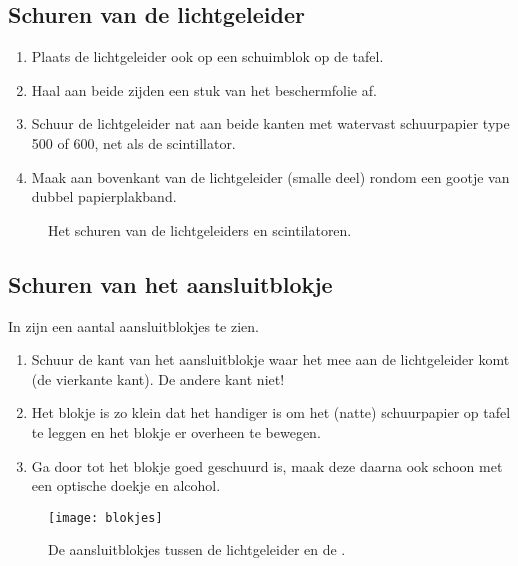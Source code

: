 \subsection{Schuren van de lichtgeleider}

\begin{enumerate}
    \item Plaats de lichtgeleider ook op een schuimblok op de tafel.
    \item Haal aan beide zijden een stuk van het beschermfolie af.
    \item Schuur de lichtgeleider nat aan beide kanten met watervast
    schuurpapier type 500 of 600, net als de scintillator.
    \item Maak aan bovenkant van de lichtgeleider (smalle deel) rondom
    een gootje van dubbel papierplakband.
\end{enumerate}

\begin{figure}
    \centering
    \caption{Het schuren van de lichtgeleiders en scintilatoren.}
\end{figure}


\subsection{Schuren van het aansluitblokje}

In  zijn een aantal aansluitblokjes te zien.

\begin{enumerate}
    \item Schuur de kant van het aansluitblokje waar het mee aan de
    lichtgeleider komt (de vierkante kant). De andere kant niet!
    \item Het blokje is zo klein dat het handiger is om het (natte)
    schuurpapier op tafel te leggen en het blokje er overheen te bewegen.
    \item Ga door tot het blokje goed geschuurd is, maak deze daarna ook
    schoon met een optische doekje en alcohol.
\end{enumerate}

\begin{figure}
    \centering
    \texttt{[image: blokjes]}
    \caption{De aansluitblokjes tussen de lichtgeleider en de \pmt.}
    \label{fig:blokjes}
\end{figure}


